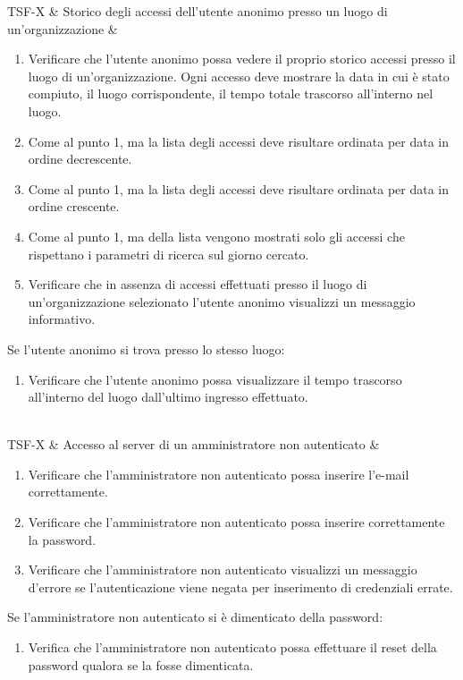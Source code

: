 TSF-X & Storico degli accessi dell'utente anonimo presso un luogo di un'organizzazione & \begin{enumerate}
    \item Verificare che l'utente anonimo possa vedere il proprio storico accessi presso il luogo di un'organizzazione. Ogni accesso deve mostrare la data in cui è stato compiuto, il luogo corrispondente, il tempo totale trascorso all'interno nel luogo.
    \item Come al punto 1, ma la lista degli accessi deve risultare ordinata per data in ordine decrescente.
    \item Come al punto 1, ma la lista degli accessi deve risultare ordinata per data in ordine crescente.
    \item Come al punto 1, ma della lista vengono mostrati solo gli accessi che rispettano i parametri di ricerca sul giorno cercato.
    \item Verificare che in assenza di accessi effettuati presso il luogo di un'organizzazione selezionato l'utente anonimo visualizzi un messaggio informativo.
\end{enumerate}
Se l'utente anonimo si trova presso lo stesso luogo:
\begin{enumerate}
    \item Verificare che l'utente anonimo possa visualizzare il tempo trascorso all'interno del luogo dall'ultimo ingresso effettuato.
\end{enumerate} \\

TSF-X & Accesso al server di un amministratore non autenticato & \begin{enumerate}
    \item Verificare che l'amministratore non autenticato possa inserire l'e-mail correttamente.
    \item Verificare che l'amministratore non autenticato possa inserire correttamente la password.
    \item Verificare che l'amministratore non autenticato visualizzi un messaggio d'errore se l'autenticazione viene negata per inserimento di credenziali errate.
\end{enumerate}
Se l'amministratore non autenticato si è dimenticato della password:
\begin{enumerate}
    \item Verifica che l'amministratore non autenticato possa effettuare il reset della password qualora se la fosse dimenticata.
\end{enumerate} \\

